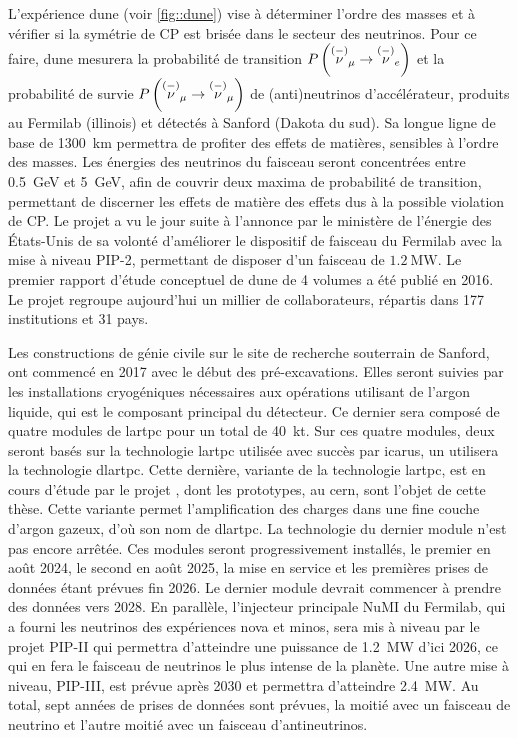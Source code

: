   L'expérience \gls{dune} (voir \autoref{fig::dune}) vise à déterminer l'ordre des masses et à vérifier si la symétrie de CP est brisée dans le secteur des neutrinos. Pour ce faire, \gls{dune} mesurera la probabilité de transition $P\left(\overset{(-)}{\nu}_{\mu}\to\overset{(-)}{\nu}_e\right)$ et la probabilité de survie $P\left(\overset{(-)}{\nu}_{\mu}\to\overset{(-)}{\nu}_{\mu}\right)$ de (anti)neutrinos d'accélérateur, produits au Fermilab (illinois) et détectés à Sanford (Dakota du sud). Sa longue ligne de base de \SI{1300}{\kilo\meter} permettra de profiter des effets de matières, sensibles à l'ordre des masses. Les énergies des neutrinos du faisceau seront concentrées entre \SI{0.5}{\giga\electronvolt} et \SI{5}{\giga\electronvolt}, afin de couvrir deux maxima de probabilité de transition, permettant de discerner les effets de matière des effets dus à la possible violation de CP. Le projet a vu le jour suite à l'annonce par le ministère de l'énergie des États-Unis de sa volonté d'améliorer le dispositif de faisceau du Fermilab avec la mise à niveau PIP-2, permettant de disposer d'un faisceau de $\SI{1.2}{\mega\watt}$\cite{PIPII}. Le premier rapport d'étude conceptuel de \gls{dune} de 4 volumes a été publié en 2016. Le projet regroupe aujourd'hui un millier de collaborateurs, répartis dans 177 institutions et 31 pays.
  
  Les constructions de génie civile sur le site de recherche souterrain de Sanford, ont commencé en 2017 avec le début des pré-excavations. Elles seront suivies par les installations cryogéniques nécessaires aux opérations utilisant de l'argon liquide, qui est le composant principal du détecteur. Ce dernier sera composé de quatre modules de \gls{lartpc} pour un total de \SI{40}{\kilo\tonne}. Sur ces quatre modules, deux seront basés sur la technologie \gls{lartpc} utilisée avec succès par \gls{icarus}, un utilisera la technologie \gls{dlartpc}. Cette dernière, variante de la technologie \gls{lartpc}, est en cours d'étude par le projet  \protodp{}, dont les prototypes, au \gls{cern}, sont l'objet de cette thèse. Cette variante permet l'amplification des charges dans une fine couche d'argon gazeux, d'où son nom de \gls{dlartpc}.  La technologie du dernier module n'est pas encore arrêtée. Ces modules seront progressivement installés, le premier en août 2024, le second en août 2025, la mise en service et les premières prises de données étant prévues fin 2026. Le dernier module devrait commencer à prendre des données vers 2028. En parallèle, l'injecteur principale NuMI du Fermilab, qui a fourni les neutrinos des expériences \gls{nova} et \gls{minos}, sera mis à niveau par le projet PIP-II qui permettra d'atteindre une puissance de \SI{1.2}{\mega\watt} d'ici 2026, ce qui en fera le faisceau de neutrinos le plus intense de la planète. Une autre mise à niveau, PIP-III, est prévue après 2030 et permettra d'atteindre \SI{2.4}{\mega\watt}. Au total, sept années de prises de données sont prévues, la moitié avec un faisceau de neutrino et l'autre moitié avec un faisceau d'antineutrinos.

